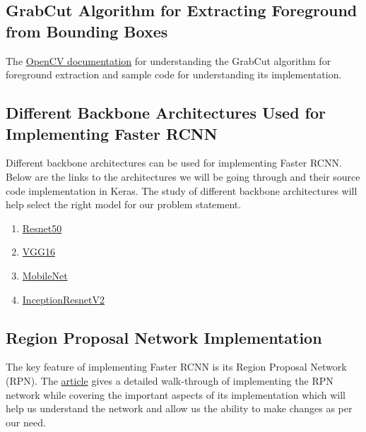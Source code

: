 \documentclass[12pt, a4paper, twoside]{article}
\begin{document}
\subsection{GrabCut Algorithm for Extracting Foreground from Bounding Boxes}
The \href{https://docs.opencv.org/3.4/d8/d83/tutorial_py_grabcut.html}{OpenCV documentation} for understanding the GrabCut algorithm for foreground extraction and sample code for understanding its implementation. 

\subsection{Different Backbone Architectures Used for Implementing Faster RCNN}
Different backbone architectures can be used for implementing Faster RCNN. Below are the links to the architectures we will be going through and their source code implementation in Keras. The study of different backbone architectures will help select the right model for our problem statement.
\begin{enumerate}
	\item \href{https://keras.io/api/applications/resnet/}{Resnet50} 
	\item \href{https://keras.io/api/applications/vgg/}{VGG16}
	\item \href{https://keras.io/api/applications/mobilenet/}{MobileNet}
	\item \href{https://keras.io/api/applications/inceptionresnetv2/}{InceptionResnetV2}
\end{enumerate}

\subsection{Region Proposal Network Implementation}
The key feature of implementing Faster RCNN is its Region Proposal Network (RPN). The \href{https://martian1231-py.medium.com/region-proposal-network-rpn-in-faster-rcnn-from-scratch-in-keras-1311c67c13cf}{article} gives a detailed walk-through of implementing the RPN network while covering the important aspects of its implementation which will help us understand the network and allow us the ability to make changes as per our need.
\end{document}
